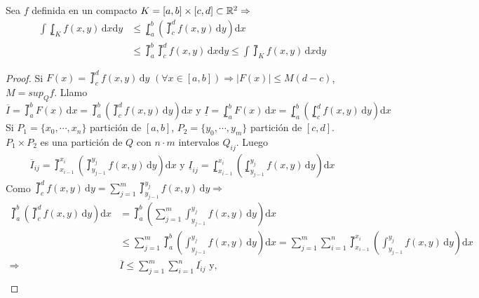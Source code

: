 \clearpage

\begin{theorem}
  Sea \(f\) definida en un compacto \(K = [a, b] \times [c, d] \subset \mathbb{R}^2 \Rightarrow\)
  \begin{align*}
    \int \lowint_K f(x, y) \, \mathrm{d}x \mathrm{d}y & \leq \lowint_a^b(\upint_c^d f(x, y)\, \mathrm{d}y)\mathrm{d}x                                                       \\
                                                      & \leq \upint_a^b \upint_c^d f(x, y) \, \mathrm{d}x \mathrm{d}y \leq \int \upint_K f(x, y) \, \mathrm{d}x \mathrm{d}y
  \end{align*}
  \begin{proof}
    Si \(F(x) = \upint_c^d f(x, y) \, \mathrm{d}y\) \((\forall x \in [a, b]) \Rightarrow |F(x)| \leq M (d - c)\), \(M = sup_Q f\). Llamo \(\overline{I} = \upint_a^b F(x)\, \mathrm{d}x = \upint_a^b(\upint_c^d f(x, y)\, \mathrm{d}y) \mathrm{d}x \text{ y }
      \underline{I} = \lowint_a^b F(x)\, \mathrm{d}x = \lowint_a^b( \lowint_c^d f(x, y)\, \mathrm{d}y) \mathrm{d}x\) \\
    Si \(P_1 = \{x_0, \cdots, x_n\}\) partición de \([a, b]\), \(P_2 = \{ y_0, \cdots, y_m \}\) partición de \([c, d]\). \(P_1 \times P_2\) es una partición de \(Q\) con \(n \cdot m\) intervalos \(Q_{ij}\). Luego \begin{align*}
      \overline{I}_{ij} = \upint_{x_{i-1}}^{x_i}( \upint_{y_{j-1}}^{y_j}f(x, y)\,\mathrm{d}y)\mathrm{d}x \text{ y }
      \underline{I}_{ij} = \lowint_{x_{i-1}}^{x_i}( \lowint_{y_{j-1}}^{y_j}f(x, y)\,\mathrm{d}y)\mathrm{d}x
    \end{align*} Como \(\upint_c^d f(x, y)\, \mathrm{d}y = \sum_{j = 1}^m \upint_{y_{j-1}}^{y_j} f(x, y)\, \mathrm{d}y \Rightarrow\) \begin{align*}
      \upint_a^b(\upint_c^d f(x, y)\, \mathrm{d}y)\mathrm{d}x & = \upint_a^b( \sum_{j = 1}^m \int_{y_{j-1}}^{y_j}f(x, y)\, \mathrm{d}y)\mathrm{d}x                                                                                                              \\
                                                              & \leq \sum_{j = 1}^m \upint_a^b(\int_{y_{j-1}}^{y_j}f(x, y)\, \mathrm{d}y)\mathrm{d}x = \sum_{j = 1}^m \sum_{i = 1}^n \upint_{x_{i-1}}^{x_i}(\int_{y_{j-1}}^{y_j}f(x,y)\,\mathrm{d}y)\mathrm{d}x \\
      \Rightarrow                                             & \overline{I} \leq \sum_{j = 1}^m \sum_{i = 1}^n \overline{I_{ij}} \text{ y,}                                                                                                                    \\

\end{align*}
\end{proof}
\end{theorem}
